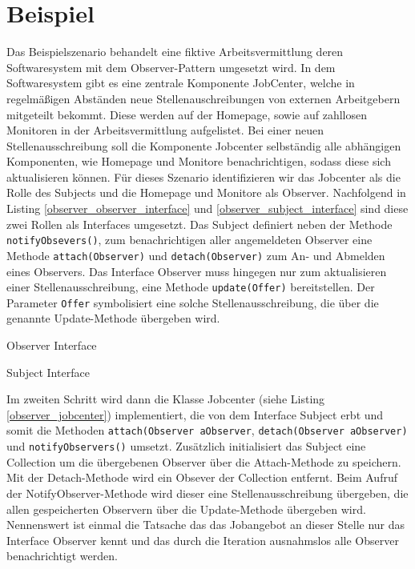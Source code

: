 \section{Beispiel}
Das Beispielszenario behandelt eine fiktive Arbeitsvermittlung deren Softwaresystem mit dem  Observer-Pattern umgesetzt wird. In dem Softwaresystem gibt es eine zentrale Komponente JobCenter, welche in regelmäßigen Abständen neue Stellenauschreibungen von externen Arbeitgebern mitgeteilt bekommt. Diese werden auf der Homepage, sowie auf zahllosen Monitoren in der Arbeitsvermittlung aufgelistet. Bei einer neuen Stellenausschreibung soll die Komponente Jobcenter selbständig alle abhängigen Komponenten, wie Homepage und Monitore benachrichtigen, sodass diese sich aktualisieren können.
Für dieses Szenario identifizieren wir das Jobcenter als die Rolle des Subjects und die Homepage und Monitore als Observer. Nachfolgend in Listing \ref{observer_observer_interface} und \ref{observer_subject_interface} sind diese zwei Rollen als Interfaces umgesetzt.
Das Subject definiert neben der Methode \texttt{notifyObsevers()}, zum benachrichtigen aller angemeldeten Observer eine Methode \texttt{attach(Observer)} und \texttt{detach(Observer)} zum An- und Abmelden eines Observers. Das Interface Observer muss hingegen nur zum aktualisieren einer Stellenausschreibung, eine Methode \texttt{update(Offer)} bereitstellen. Der Parameter \texttt{Offer} symbolisiert eine solche Stellenausschreibung, die über die genannte Update-Methode übergeben wird.


\begin{listing}[h!]
   \centering
   \caption{Observer Interface}
    \label{observer_observer_interface}
\end{listing}     
 
\begin{listing}[h!]
   \centering
   \caption{Subject Interface}
    \label{observer_subject_interface}
\end{listing}  
          
  
Im zweiten Schritt wird dann die Klasse Jobcenter (siehe Listing \ref{observer_jobcenter}) implementiert, die von dem Interface Subject erbt und somit die Methoden \texttt{attach(Observer aObserver}, \texttt{detach(Observer aObserver)} und \texttt{notifyObservers()} umsetzt. Zusätzlich initialisiert das Subject eine Collection um die übergebenen Observer über die Attach-Methode zu speichern. Mit der Detach-Methode wird ein Obsever der Collection entfernt. Beim Aufruf der NotifyObserver-Methode wird dieser eine Stellenausschreibung übergeben, die allen gespeicherten Observern über die Update-Methode übergeben wird. 
Nennenswert ist einmal die Tatsache das das Jobangebot an dieser Stelle nur das Interface Observer kennt und das durch die Iteration ausnahmslos alle Observer benachrichtigt werden.

